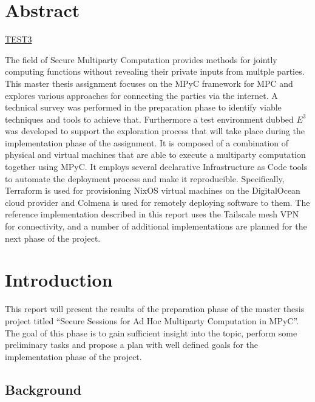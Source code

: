 \hypertarget{abstract}{%
\chapter*{Abstract}\label{abstract}}

\href{prep/010-introduction.md\#background}{TEST3}

The field of Secure Multiparty Computation provides methods for jointly
computing functions without revealing their private inputs from multple
parties. This master thesis assignment focuses on the MPyC framework for
MPC and explores various approaches for connecting the parties via the
internet. A technical survey was performed in the preparation phase to
identify viable techniques and tools to achieve that. Furthermore a test
environment dubbed \(E^3\) was developed to support the exploration
process that will take place during the implementation phase of the
assignment. It is composed of a combination of physical and virtual
machines that are able to execute a multiparty computation together
using MPyC. It employs several declarative Infrastructure as Code tools
to automate the deployment process and make it reproducible.
Specifically, Terraform is used for provisioning NixOS virtual machines
on the DigitalOcean cloud provider and Colmena is used for remotely
deploying software to them. The reference implementation described in
this report uses the Tailscale mesh VPN for connectivity, and a number
of additional implementations are planned for the next phase of the
project.

\tableofcontents

\printnoidxglossary[type=\acronymtype,title=List of Abbreviations]
\listoffigures

\mainmatter

\hypertarget{introduction}{%
\chapter{Introduction}\label{introduction}}

This report will present the results of the preparation phase of the
master thesis project titled ``Secure Sessions for Ad Hoc Multiparty
Computation in MPyC''. The goal of this phase is to gain sufficient
insight into the topic, perform some preliminary tasks and propose a
plan with well defined goals for the implementation phase of the
project.

\hypertarget{background}{%
\section{Background}\label{background}}


